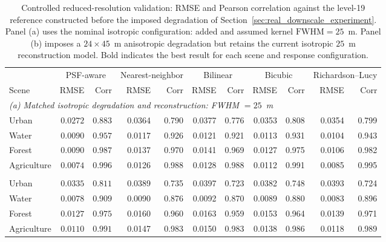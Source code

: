 \documentclass[journal]{IEEEtran}
\begin{document}
\begin{table}[t]
\centering
\caption{Controlled reduced-resolution validation: RMSE and Pearson
correlation against the level-19 reference constructed before the imposed degradation
of Section~\ref{sec:real_downscale_experiment}. Panel (a) uses the nominal
isotropic configuration: added and assumed kernel $\mathrm{FWHM}=25$~m.
Panel (b) imposes a $24\times45$~m anisotropic degradation but retains
the current isotropic $25$~m reconstruction model. Bold indicates the
best result for each scene and response configuration.}
\label{tab:real_downscale}
\setlength{\tabcolsep}{5pt}
\begin{tabular}{lrrrrrrrrrr}
\toprule
 & \multicolumn{2}{c}{PSF-aware} & \multicolumn{2}{c}{Nearest-neighbor} & \multicolumn{2}{c}{Bilinear} & \multicolumn{2}{c}{Bicubic} & \multicolumn{2}{c}{Richardson--Lucy} \\
\cmidrule(lr){2-3}\cmidrule(lr){4-5}\cmidrule(lr){6-7}\cmidrule(lr){8-9}\cmidrule(lr){10-11}
Scene & RMSE & Corr & RMSE & Corr & RMSE & Corr & RMSE & Corr & RMSE & Corr \\
\midrule
\multicolumn{11}{l}{\textit{(a) Matched isotropic degradation and reconstruction: FWHM $=25$~m}} \\
Urban       & $\mathbf{0.0272}$ & $\mathbf{0.883}$ & 0.0364 & 0.790 & 0.0377 & 0.776 & 0.0353 & 0.808 & 0.0354 & 0.799 \\
Water       & $\mathbf{0.0090}$ & $\mathbf{0.957}$ & 0.0117 & 0.926 & 0.0121 & 0.921 & 0.0113 & 0.931 & 0.0104 & 0.943 \\
Forest      & $\mathbf{0.0090}$ & $\mathbf{0.987}$ & 0.0137 & 0.970 & 0.0141 & 0.969 & 0.0127 & 0.975 & 0.0106 & 0.982 \\
Agriculture & $\mathbf{0.0074}$ & $\mathbf{0.996}$ & 0.0126 & 0.988 & 0.0128 & 0.988 & 0.0112 & 0.991 & 0.0085 & 0.995 \\
\addlinespace
\multicolumn{11}{l}{\textit{(b) Anisotropic $24\times45$~m degradation; isotropic $25$~m reconstruction}} \\
Urban       & $\mathbf{0.0335}$ & $\mathbf{0.811}$ & 0.0389 & 0.735 & 0.0397 & 0.723 & 0.0382 & 0.748 & 0.0393 & 0.724 \\
Water       & $\mathbf{0.0078}$ & $\mathbf{0.909}$ & 0.0090 & 0.876 & 0.0092 & 0.870 & 0.0089 & 0.880 & 0.0083 & 0.896 \\
Forest      & $\mathbf{0.0127}$ & $\mathbf{0.975}$ & 0.0160 & 0.960 & 0.0163 & 0.959 & 0.0153 & 0.964 & 0.0139 & 0.971 \\
Agriculture & $\mathbf{0.0110}$ & $\mathbf{0.991}$ & 0.0147 & 0.983 & 0.0150 & 0.983 & 0.0138 & 0.986 & 0.0118 & 0.989 \\
\bottomrule
\end{tabular}
\end{table}
\end{document}
